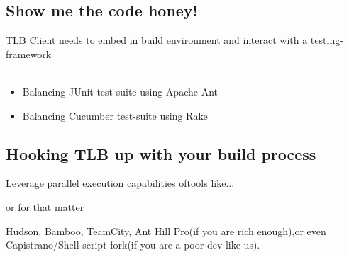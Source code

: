\documentclass{beamer}
\begin{document}
\subsection{Show me the code honey!}

\begin{frame}
  \begin{centering}
    {\small TLB Client needs to embed in build environment and interact with a testing-framework}
    \quad\\
    \quad\\
    \pause
    \begin{itemize}
    \item Balancing JUnit test-suite using Apache-Ant
      \pause
    \item Balancing Cucumber test-suite using Rake
    \end{itemize}
  \end{centering}
\end{frame}

\subsection{Hooking TLB up with your build process}

\begin{frame}{Leverage parallel execution capabilities of}{tools like...}
  \begin{center}
  \end{center}
\end{frame}

\begin{frame}{or for that matter}
  \begin{center}
    {\huge Hudson, Bamboo, TeamCity, Ant Hill Pro}(if you are rich enough),{\huge or even Capistrano/Shell script fork}(if you are a poor dev like us).\\
  \end{center}
\end{frame}
\end{document}

